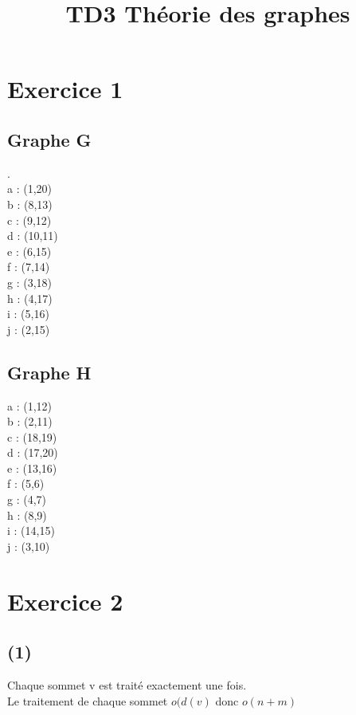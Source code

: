\documentclass{article}
\title{TD3 Théorie des graphes}
\author{}
\date{}
\begin{document}
\maketitle{}
\section*{Exercice 1}
\subsection*{Graphe G}
. \\
a : (1,20) \\
b : (8,13) \\
c : (9,12) \\
d : (10,11) \\
e : (6,15) \\
f : (7,14) \\
g : (3,18) \\
h : (4,17) \\
i : (5,16) \\
j : (2,15) \\
\subsection*{Graphe H}
a : (1,12) \\
b : (2,11) \\
c : (18,19) \\
d : (17,20) \\
e : (13,16) \\
f : (5,6) \\
g : (4,7) \\
h : (8,9) \\
i : (14,15) \\
j : (3,10) 

\section*{Exercice 2}
\subsection*{(1)}
Chaque sommet v est traité exactement une fois. \\
Le traitement de chaque sommet $o(d(v)$ donc $o(n+m)$
\newpage
\end{document}
